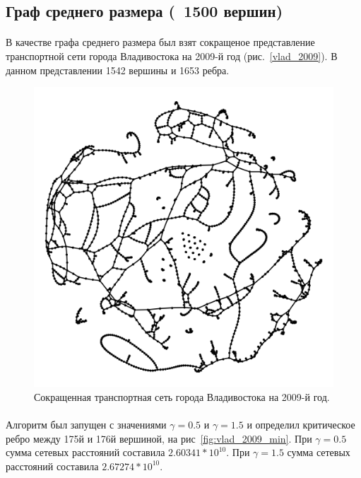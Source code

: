 \documentclass[12pt]{article}
\begin{document}
\subsection{Граф среднего размера (~1500 вершин)}

\paragraph{}
В качестве графа среднего размера был взят сокращеное представление 
транспортной сети города Владивостока на 2009-й год (рис.~\ref{vlad_2009}). 
В данном представлении 1542 вершины и 1653 ребра.

\begin{figure}[h]
    \centering
    \includegraphics[scale=0.3]{vlad_2009.png}
    \caption{Сокращенная транспортная сеть города Владивостока на 2009-й год.}
    \label{fig:vlad_2009}
\end{figure}

\paragraph{}
Алгоритм был запущен с значениями $\gamma = 0.5$ и $\gamma = 1.5$ и определил 
критическое ребро между 175й и 176й вершиной, на рис~\ref{fig:vlad_2009_min}. 
При $\gamma = 0.5$ сумма сетевых расстояний составила $2.60341*10^{10}$. 
При $\gamma = 1.5$ сумма сетевых расстояний составила $2.67274*10^{10}$.
\end{document}
